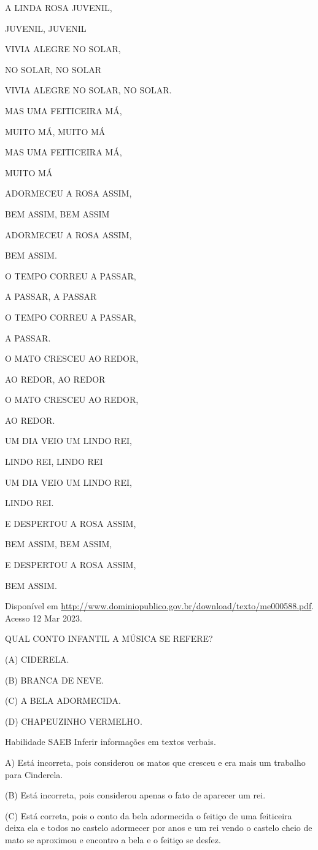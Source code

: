 A LINDA ROSA JUVENIL,

JUVENIL, JUVENIL

VIVIA ALEGRE NO SOLAR,

NO SOLAR, NO SOLAR

VIVIA ALEGRE NO SOLAR, NO SOLAR.

MAS UMA FEITICEIRA MÁ,

MUITO MÁ, MUITO MÁ

MAS UMA FEITICEIRA MÁ,

MUITO MÁ

ADORMECEU A ROSA ASSIM,

BEM ASSIM, BEM ASSIM

ADORMECEU A ROSA ASSIM,

BEM ASSIM.

O TEMPO CORREU A PASSAR,

A PASSAR, A PASSAR

O TEMPO CORREU A PASSAR,

A PASSAR.

O MATO CRESCEU AO REDOR,

AO REDOR, AO REDOR

O MATO CRESCEU AO REDOR,

AO REDOR.

UM DIA VEIO UM LINDO REI,

LINDO REI, LINDO REI

UM DIA VEIO UM LINDO REI,

LINDO REI.

E DESPERTOU A ROSA ASSIM,

BEM ASSIM, BEM ASSIM,

E DESPERTOU A ROSA ASSIM,

BEM ASSIM.

Disponível em
\url{http://www.dominiopublico.gov.br/download/texto/me000588.pdf}.
Acesso 12 Mar 2023.

QUAL CONTO INFANTIL A MÚSICA SE REFERE?

(A) CIDERELA.

(B) BRANCA DE NEVE.

(C) A BELA ADORMECIDA.

(D) CHAPEUZINHO VERMELHO.

Habilidade SAEB Inferir informações em textos verbais.

A) Está incorreta, pois considerou os matos que cresceu e era mais um
trabalho para Cinderela.

(B) Está incorreta, pois considerou apenas o fato de aparecer um rei.

(C) Está correta, pois o conto da bela adormecida o feitiço de uma
feiticeira deixa ela e todos no castelo adormecer por anos e um rei
vendo o castelo cheio de mato se aproximou e encontro a bela e o feitiço
se desfez.

